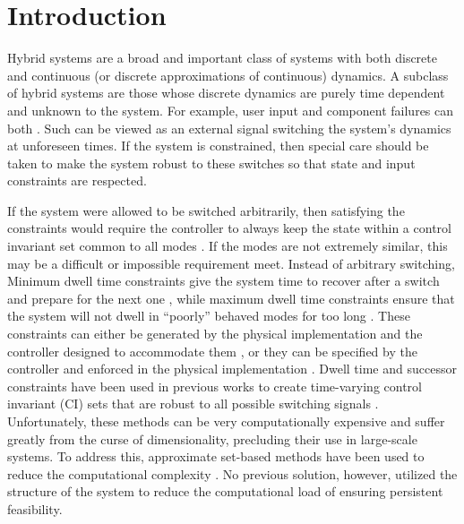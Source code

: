 \section{Introduction}
Hybrid systems are a broad and important class of systems with both discrete and continuous (or discrete approximations of continuous) dynamics. A subclass of hybrid systems are those whose discrete dynamics are purely time dependent and unknown to the system. For example, user input and component failures can both . Such  can be viewed as an external signal switching the system's dynamics at unforeseen times. If the system is constrained, then special care should be taken to make the system robust to these switches so that state and input constraints are respected. 

If the system were allowed to be switched arbitrarily, then satisfying the constraints would require the controller to always keep the state within a control invariant set common to all modes \cite{Liberzon1999}. If the modes are not extremely similar, this may be a  difficult or impossible requirement meet. Instead of arbitrary switching,  Minimum dwell time constraints give the system time to recover after a switch and prepare for the next one \cite{Danielson2019}, while maximum dwell time constraints ensure that the system will not dwell in ``poorly'' behaved modes for too long \cite{Hall2022}. These constraints can either be generated by the physical implementation and the controller designed to accommodate them \cite{Danielson2019}, or they can be specified by the controller and enforced in the physical implementation \cite{Zhang2016}. Dwell time and successor constraints have been used in previous works to create time-varying control invariant (CI) sets that are robust to all possible switching signals . Unfortunately, these methods can be very computationally expensive and suffer greatly from the curse of dimensionality, precluding their use in large-scale systems. To address this, approximate set-based methods have been used to reduce the computational complexity . No previous solution, however, utilized the structure of the system to reduce the computational load of ensuring persistent feasibility. 


